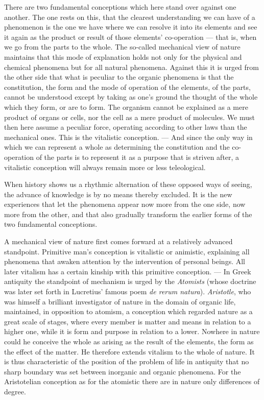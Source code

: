 \documentclass[12pt,a4paper]{article}
\begin{document}
There are two fundamental conceptions which here stand over against one another.
The one rests on this, that the clearest understanding we can have of a
phenomenon is the one we have where we can resolve it into its elements and see
it again as the product or result of those elements' co-operation --- that is,
when we go from the parts to the whole. The so-called mechanical view of nature
maintains that this mode of explanation holds not only for the physical and
chemical phenomena but for all natural phenomena. Against this it is urged from
the other side that what is peculiar to the organic phenomena is that the
constitution, the form and the mode of operation of the elements, of the parts,
cannot be understood except by taking as one's ground the thought of the whole
which they form, or are to form. The organism cannot be explained as a mere
product of organs or cells, nor the cell as a mere product of molecules. We must
then here assume a peculiar force, operating according to other laws than the
mechanical ones. This is the vitalistic conception. --- And since the only way in
which we can represent a whole as determining the constitution and the
co-operation of the parts is to represent it as a purpose that is striven after,
a vitalistic conception will always remain more or less teleological.

When history shows us a rhythmic alternation of these opposed ways of seeing,
the advance of knowledge is by no means thereby excluded. It is the new
experiences that let the phenomena appear now more from the one side, now more
from the other, and that also gradually transform the earlier forms of the two
fundamental conceptions.

A mechanical view of nature first comes forward at a relatively advanced
standpoint. Primitive man's conception is vitalistic or animistic, explaining
all phenomena that awaken attention by the intervention of personal beings. All
later vitalism has a certain kinship with this primitive conception. --- In
Greek antiquity the standpoint of mechanism is urged by the \emph{Atomists}
(whose doctrine was later set forth in Lucretius' famous poem \textit{de rerum
natura}).
\emph{Aristotle}, who was himself a brilliant investigator of nature in the
domain of organic life, maintained, in opposition to atomism, a conception which
regarded nature as a great scale of stages, where every member is matter and
means in relation to a higher one, while it is form and purpose in relation to a
lower. Nowhere in nature could he conceive the whole as arising as the result of
the elements, the form as the effect of the matter. He therefore extends
vitalism to the whole of nature. It is thus characteristic of the position of
the problem of life in antiquity that no sharp boundary was set between
inorganic and organic phenomena. For the Aristotelian conception as for the
atomistic there are in nature only differences of degree.
\end{document}
